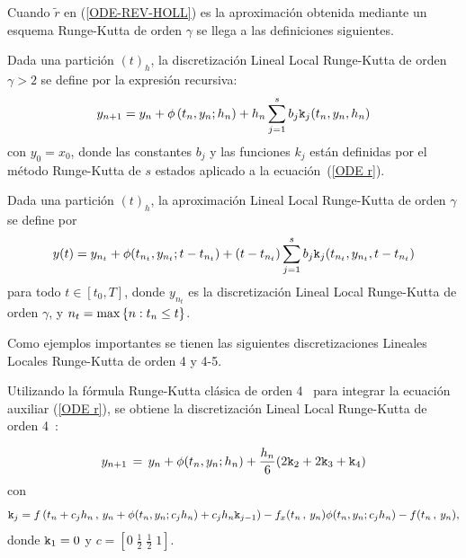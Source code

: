 Cuando $\widetilde{r}$ en (\ref{ODE-REV-HOLL})  es la aproximación obtenida mediante un esquema Runge-Kutta de orden $\gamma$ se llega a las definiciones siguientes.
\begin{definition}
	\label{definition HLLD} \cite{Jimenez13} Dada una partición $(t)_{h}$, la discretización Lineal Local Runge-Kutta 
    de orden $\gamma >2$ se define por la expresión recursiva:
	\begin{equation*}
	y_{n+1}=y_{n}+\phi \left( t_{n},y_{n};h_{n}\right) +h_{n}\sum_{j=1}^{s}b_{j}\mathtt{k}_{j}(t_n,y_n,h_n)
	\end{equation*}%
	con $y_{0}=x_{0}$, donde las constantes $b_{j}$ y las funciones $k_{j}$ están definidas por el método Runge-Kutta de $s$ estados aplicado a la ecuación~(\ref{ODE r}).
\end{definition}
\begin{definition}
	\label{definition HOLLA} \cite{Jimenez13} Dada una partición $(t)_{h}$, la aproximación Lineal Local Runge-Kutta de orden $\gamma$ se define por 
	\begin{equation*}
	y(t)=y_{n_{t}}+\phi(t_{n_{t}},y_{n_{t}};t-t_{n_{t}})+(t-t_{n_{t}})%
	\sum_{j=1}^{s}b_{j}\kt_{j}(t_{n_{t}},y_{n_{t}},t-t_{n_{t}}) %
	\end{equation*}
	para todo $t\in[t_{0},T]$, donde $y_{n_{t}}$ es la discretización Lineal Local Runge-Kutta de orden $\gamma$, y $n_{t}=\max\left\{ n:t_{n}\leq t \right\}$.
\end{definition}

Como ejemplos importantes se tienen las siguientes discretizaciones Lineales Locales Runge-Kutta de orden 4 y 4-5.

Utilizando la fórmula Runge-Kutta clásica de orden 4~\cite{hairer1993solving} para integrar la ecuación auxiliar (\ref{ODE r}), se obtiene la discretización Lineal Local Runge-Kutta de orden 4~\cite{Jimenez13}:

\begin{equation}
    y_{n+1}\,=\,y_n+\phi(t_n,y_n;h_n)+\frac{h_n}{6}(2\mathtt{k}_2+2\mathtt{k}_3+\mathtt{k}_4)
    \label{LL-scheme-4}
\end{equation}
con
    \[ \mathtt{k}_j = f\left( t_n+c_jh_n\, , \, y_n+\phi(t_n,y_n;c_jh_n)+c_jh_n\mathtt{k}_{j-1} \right)
- f_x(t_n\, , \, y_n)\phi(t_n,y_n;c_jh_n) - f(t_n\, ,\, y_n) ,\]
donde $\mathtt{k}_1=0$ y $c = \left[ 0 \; \frac{1}{2} \; \frac{1}{2} \; 1  \right]$.

